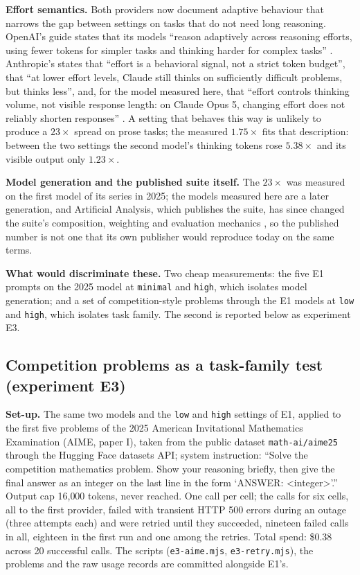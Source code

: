 \documentclass[11pt]{article}
\begin{document}
\textbf{Effort semantics.} Both providers now document adaptive behaviour that narrows the
gap between settings on tasks that do not need long reasoning. OpenAI's guide states that
its models ``reason adaptively across reasoning efforts, using fewer tokens for simpler
tasks and thinking harder for complex tasks'' \citep{openai2026reasoning}. Anthropic's
states that ``effort is a behavioral signal, not a strict token budget'', that ``at lower
effort levels, Claude still thinks on sufficiently difficult problems, but thinks less'',
and, for the model measured here, that ``effort controls thinking volume, not visible
response length: on Claude Opus 5, changing effort does not reliably shorten responses''
\citep{anthropic2026effort}. A setting that behaves this way is unlikely to produce a $23\times$
spread on prose tasks; the measured $1.75\times$ fits that description: between the two settings the second model's thinking tokens rose $5.38\times$ and its visible output only $1.23\times$.

\textbf{Model generation and the published suite itself.} The $23\times$ was measured on
the first model of its series in 2025; the models measured here are a later generation,
and Artificial Analysis, which publishes the suite, has since changed the suite's composition,
weighting and evaluation mechanics \citep{aaintelligence}, so the published number is not
one that its own publisher would reproduce today on the same terms.

\textbf{What would discriminate these.} Two cheap measurements: the five E1 prompts on the
2025 model at \texttt{minimal} and \texttt{high}, which isolates model generation; and a
set of competition-style problems through the E1 models at \texttt{low} and \texttt{high},
which isolates task family. The second is reported below as experiment E3.

\subsection{Competition problems as a task-family test (experiment E3)}
\label{app:e3}

\textbf{Set-up.} The same two models and the \texttt{low} and \texttt{high} settings of
E1, applied to the first five problems of the 2025 American Invitational Mathematics
Examination (AIME, paper I), taken from the public dataset \texttt{math-ai/aime25} through the
Hugging Face datasets API; system instruction: ``Solve the competition mathematics
problem. Show your reasoning briefly, then give the final answer as an integer on the
last line in the form `ANSWER: <integer>'.'' Output cap 16{,}000 tokens, never reached.
One call per cell; the calls for six cells, all to the first provider, failed with transient HTTP 500 errors during
an outage (three attempts each) and were retried until they succeeded, nineteen failed calls in all, eighteen in the first run and one among the retries. Total spend: \$0.38 across 20 successful calls. The
scripts (\texttt{e3-aime.mjs}, \texttt{e3-retry.mjs}), the problems and the raw usage
records are committed alongside E1's.
\end{document}
